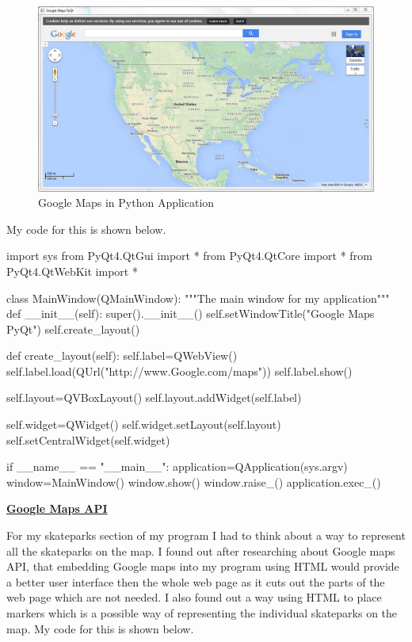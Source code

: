 \begin{figure}[H]
    \includegraphics[width=\textwidth]{./Design/Prototype/GoogleMaps.JPG}
    \caption{Google Maps in Python Application} \label{fig:Google Maps}
\end{figure}

My code for this is shown below.

\begin{python}
import sys
from PyQt4.QtGui import *
from PyQt4.QtCore import *
from PyQt4.QtWebKit import *

class MainWindow(QMainWindow):
    """The main window for my application"""
    def __init__(self):
        super().__init__()
        self.setWindowTitle("Google Maps PyQt")
        self.create_layout()

    def create_layout(self):
        self.label=QWebView()
        self.label.load(QUrl("http://www.Google.com/maps"))
        self.label.show()

        self.layout=QVBoxLayout()
        self.layout.addWidget(self.label)

        self.widget=QWidget()
        self.widget.setLayout(self.layout)
        self.setCentralWidget(self.widget)
        
if __name__ == "__main__":
    application=QApplication(sys.argv)
    window=MainWindow()
    window.show()
    window.raise_()
    application.exec_()

\end{python}

\textbf{\underline{Google Maps API}}

For my skateparks section of my program I had to think about a way to represent all the skateparks on the map. I found out after researching about Google maps API, that embedding Google maps into my program using HTML would provide a better user interface then the whole web page as it cuts out the parts of the web page which are not needed. I also found out a way using HTML to place markers which is a possible way of representing the individual skateparks on the map. My code for this is shown below.

